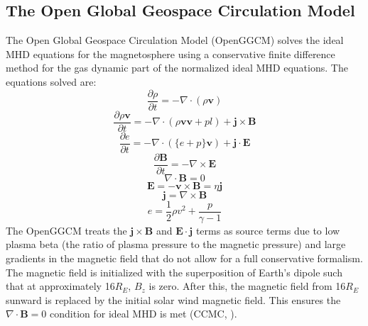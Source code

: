 \subsection{The Open Global Geospace Circulation Model}
The Open Global Geospace Circulation Model (OpenGGCM) solves the ideal MHD
equations for the magnetosphere using a conservative finite
difference method for the gas dynamic part of the normalized ideal MHD equations.
The equations solved are: $$ \frac{\partial \rho}{\partial t} = -\nabla \cdot
(\rho \mathbf{v}) $$ $$ \frac{\partial \rho \mathbf{v}}{\partial t} = -\nabla \cdot (\rho \mathbf{vv} +
pl)+ \mathbf{j} \times \mathbf{B}$$ $$ \frac{\partial e}{\partial t} = -\nabla
\cdot (\{e+p\}\mathbf{v}) + \mathbf{j} \cdot \mathbf{E} $$ $$ \frac{\partial
\mathbf{B}}{\partial t} = - \nabla \times \mathbf{E} $$ $$ \nabla \cdot
\mathbf{B} = 0 $$ $$ \mathbf{E} = -\mathbf{v}\times\mathbf{B} = \eta \mathbf{j}
$$ $$ \mathbf{j} = \nabla \times \mathbf{B} $$ $$ e = \frac{1}{2} \rho v^2 +
\frac{p}{\gamma -1} $$ The OpenGGCM treats the $\mathbf{j} \times \mathbf{B}$
and $\mathbf{E} \cdot \mathbf{j}$ terms as source terms due to low plasma beta (the ratio of plasma pressure to the magnetic pressure)
and large gradients in the magnetic field that do not allow for a full
conservative formalism. The magnetic field is initialized with the superposition of 
Earth's dipole such that at approximately 16$R_E$, $B_z$ is zero. After
this, the magnetic field from 16$R_E$ sunward is replaced by the initial solar wind
magnetic field. This ensures the $\nabla \cdot \mathbf{B} = 0$ condition for
ideal MHD is met (CCMC, \citeyear{CCMCOpenGGCM}).


